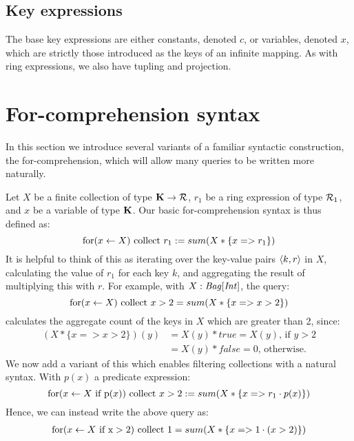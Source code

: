 {{{\subsection{Key expressions} {
The base key expressions are either constants, denoted $c$, or variables, denoted $x$, which are strictly those introduced as the keys of an infinite mapping. As with ring expressions, we also have tupling and projection. 
}

\section{For-comprehension syntax} {
In this section we introduce several variants of a familiar syntactic construction, the for-comprehension, which will allow many queries to be written more naturally.

Let $X$ be a finite collection of type $\mathbf{K} \rightarrow \mathcal{R}$, $r_1$ be a ring expression of type $\mathcal{R}_1$, and $x$ be a variable of type $\mathbf{K}$. Our basic for-comprehension syntax is thus defined as:
\begin{equation*}
\textrm{for}(x \leftarrow X) \textrm{ collect } r_1 := sum(X * \{x => r_1\})
\end{equation*}
It is helpful to think of this as iterating over the key-value pairs $\langle k, r \rangle$ in $X$, calculating the value of $r_1$ for each key $k$, and aggregating the result of multiplying this with $r$. For example, with $X: \textrm{\textit{Bag}}[\textrm{\textit{Int}}]$, the query:
\begin{equation*} 
\textrm{for}(x \leftarrow X) \textrm{ collect } x > 2 = sum(X * \{x => x > 2\})
\end{equation*}
calculates the aggregate count of the keys in $X$ which are greater than 2, since:
\begin{equation*}
\begin{split}
(X*\{x => x > 2\})(y) &= X(y)*true = X(y)\textrm{, if } y > 2 \\
 &= X(y)*false = 0\textrm{, otherwise.}
\end{split}
\end{equation*}
We now add a variant of this which enables filtering collections with a natural syntax. With $p(x)$ a predicate expression:
\begin{equation*}
\textrm{for}(x \leftarrow X \textrm{ if p}(x)) \textrm{ collect } x > 2 := sum(X * \{x => r_1 \cdot p(x) \})
\end{equation*}
Hence, we can instead write the above query as:
\begin{equation*}
\begin{split}
\ForIf{x}{X}{x > 2} \Collect{1} &= sum(X * \{x => 1 \cdot (x > 2) \}) \\

\end{split}
\end{equation*}}}}}
